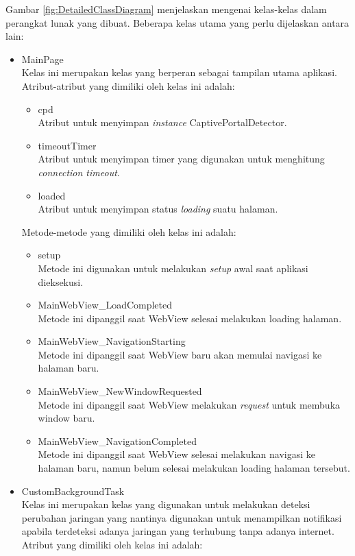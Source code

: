 Gambar \ref{fig:DetailedClassDiagram} menjelaskan mengenai kelas-kelas dalam perangkat lunak yang dibuat. Beberapa kelas utama yang perlu dijelaskan antara lain:

\begin{itemize}
    \item{
        MainPage\\Kelas ini merupakan kelas yang berperan sebagai tampilan utama aplikasi. Atribut-atribut yang dimiliki oleh kelas ini adalah:
        \begin{itemize}
            \item{cpd\\Atribut untuk menyimpan \textit{instance} CaptivePortalDetector.}
            \item{timeoutTimer\\Atribut untuk menyimpan timer yang digunakan untuk menghitung \textit{connection timeout}.}
            \item{loaded\\Atribut untuk menyimpan status \textit{loading} suatu halaman.}
        \end{itemize}
        Metode-metode yang dimiliki oleh kelas ini adalah:
        \begin{itemize}
            \item{setup\\Metode ini digunakan untuk melakukan \textit{setup} awal saat aplikasi dieksekusi.}
            \item{MainWebView\_LoadCompleted\\Metode ini dipanggil saat WebView selesai melakukan loading halaman.}
            \item{MainWebView\_NavigationStarting\\Metode ini dipanggil saat WebView baru akan memulai navigasi ke halaman baru.}
            \item{MainWebView\_NewWindowRequested\\Metode ini dipanggil saat WebView melakukan \textit{request} untuk membuka window baru.}
            \item{MainWebView\_NavigationCompleted\\Metode ini dipanggil saat WebView selesai melakukan navigasi ke halaman baru, namun belum selesai melakukan loading halaman tersebut.}
        \end{itemize}
    }
    \item{
        CustomBackgroundTask\\Kelas ini merupakan kelas yang digunakan untuk melakukan deteksi perubahan jaringan yang nantinya digunakan untuk menampilkan notifikasi apabila terdeteksi adanya jaringan yang terhubung tanpa adanya internet. Atribut yang dimiliki oleh kelas ini adalah:
}
\end{itemize}
